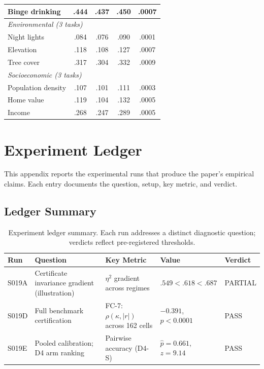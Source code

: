 \documentclass{article}
\begin{document}
\begin{table}[htbp]
\begin{tabular}{l|c|cc|c}
Binge drinking         & .444 & .437 & .450 & .0007 \\
\midrule
\multicolumn{5}{l}{\emph{Environmental (3 tasks)}} \\
Night lights           & .084 & .076 & .090 & .0001 \\
Elevation              & .118 & .108 & .127 & .0007 \\
Tree cover             & .317 & .304 & .332 & .0009 \\
\midrule
\multicolumn{5}{l}{\emph{Socioeconomic (3 tasks)}} \\
Population density     & .107 & .101 & .111 & .0003 \\
Home value             & .119 & .104 & .132 & .0005 \\
Income                 & .268 & .247 & .289 & .0005 \\
\bottomrule
\end{tabular}
\end{table}


\section{Experiment Ledger}
\label{app:experiment_ledger}

This appendix reports the experimental runs that produce the paper's empirical claims. Each entry documents the question, setup, key metric, and verdict.

\subsection{Ledger Summary}

\begin{table}[htbp]
\centering
\small
\caption{Experiment ledger summary. Each run addresses a distinct diagnostic question; verdicts reflect pre-registered thresholds.}
\label{tab:experiment_ledger}
\begin{tabular}{lllll}
\toprule
\textbf{Run} & \textbf{Question} & \textbf{Key Metric} & \textbf{Value} & \textbf{Verdict} \\
\midrule
S019A & Certificate invariance gradient (illustration) & $\eta^2$ gradient across regimes & $.549 < .618 < .687$ & PARTIAL \\
S019D & Full benchmark certification & FC-7: $\rho(\kappa, |r|)$ across 162 cells & $-0.391$, $p < 0.0001$ & PASS \\
S019E & Pooled calibration; D4 arm ranking & Pairwise accuracy (D4-S) & $\hat{p} = 0.661$, $z = 9.14$ & PASS \\
\bottomrule
\end{tabular}
\end{table}
\end{document}
